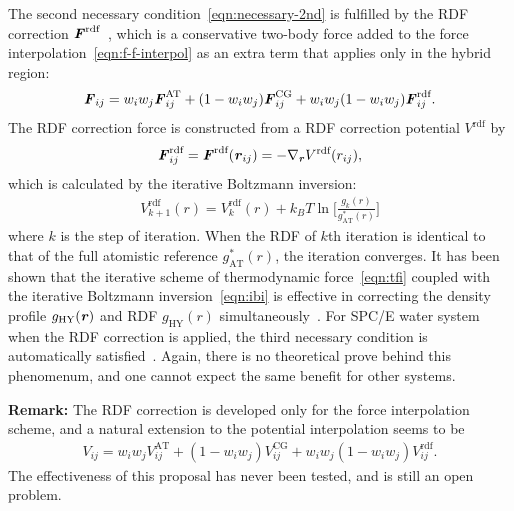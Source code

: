 \documentclass[epjST]{svjour}
\newcommand{\vect}[1]{\textbf{\textit{#1}}}
\newcommand{\AT}[0]{\textrm{AT}}
\newcommand{\HY}[0]{\textrm{HY}}
\newcommand{\CG}[0]{\textrm{CG}}
\newcommand{\moleidxone}[0]{i}
\newcommand{\moleidxtwo}[0]{j}
\newcommand{\rdf}{{\textrm{rdf}}}
\begin{document}
The second necessary condition~\eqref{eqn:necessary-2nd} is fulfilled by the
RDF correction $\vect F^\rdf$~\cite{wang2012adaptive}, which is a conservative two-body force added to the force interpolation~\eqref{eqn:f-f-interpol} as an extra term
that applies only in the hybrid region:
\begin{align}\label{eqn:rdf-corr-f}
  {\vect F}_{\moleidxone \moleidxtwo}
  =
  w_\moleidxone w_\moleidxtwo{\vect F}_{\moleidxone\moleidxtwo}^{\AT}
  +
  (1-w_\moleidxone w_\moleidxtwo){\vect F}^{\CG}_{\moleidxone\moleidxtwo}
  +
  w_\moleidxone w_\moleidxtwo(1-w_\moleidxone w_\moleidxtwo){\vect F}^{\rdf}_{\moleidxone\moleidxtwo}.
\end{align}
The RDF correction force is constructed from a RDF correction potential $V^\rdf$ by
\begin{align}
  \vect F_{\moleidxone\moleidxtwo}^\rdf = \vect F^\rdf(\vect r_{\moleidxone\moleidxtwo})
  = -\nabla_{\vect r} V^\rdf(r_{\moleidxone\moleidxtwo}),
\end{align}
which is calculated by the iterative Boltzmann inversion:
\begin{align}\label{eqn:ibi}
  V_{k+1}^\rdf(r) = V_k^\rdf(r) + k_BT \ln \Big[\frac{g_k(r)}{g^\ast_\AT(r)}\Big] 
\end{align}
where $k$ is the step of iteration. When the RDF of $k$th iteration is
identical to that of the full atomistic reference $g^\ast_\AT(r)$, the
iteration converges. It has been shown that the iterative scheme of
thermodynamic force~\eqref{eqn:tfi} coupled with the iterative Boltzmann inversion~\eqref{eqn:ibi}
is effective in correcting the density profile $g_\HY(\vect r)$ and
RDF $g_\HY(r)$ simultaneously~\cite{wang2012adaptive}.
For SPC/E water system when the RDF correction is applied, the third
necessary condition is automatically satisfied~\cite{wang2013grand}. Again, there is no
theoretical prove behind this phenomenum, and one cannot expect the same
benefit for other systems.

\noindent\textbf{Remark:} The RDF correction is developed only for the force interpolation scheme,
and a natural extension to the potential interpolation seems to be
\begin{align}
  {V}_{\moleidxone \moleidxtwo}
  =
  w_\moleidxone w_\moleidxtwo{V}_{\moleidxone\moleidxtwo}^{\AT}
  +
  (1-w_\moleidxone w_\moleidxtwo){V}^{\CG}_{\moleidxone\moleidxtwo}
  +
  w_\moleidxone w_\moleidxtwo(1-w_\moleidxone w_\moleidxtwo){V}^{\rdf}_{\moleidxone\moleidxtwo}.  
\end{align}
The effectiveness of this proposal has never been tested, and is still an open problem.
\end{document}
